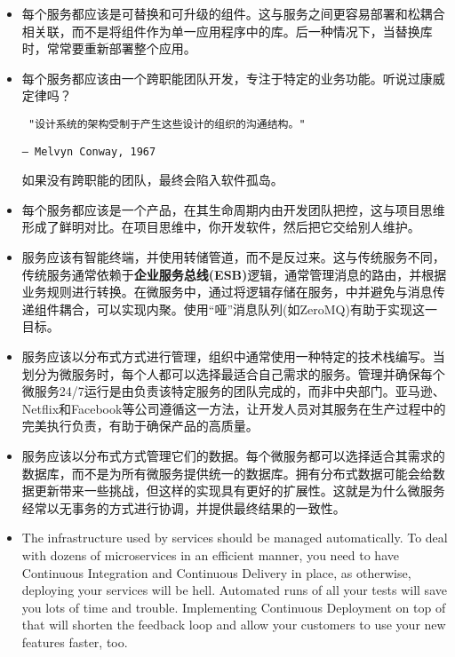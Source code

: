 \begin{itemize}
\item	
每个服务都应该是可替换和可升级的组件。这与服务之间更容易部署和松耦合相关联，而不是将组件作为单一应用程序中的库。后一种情况下，当替换库时，常常要重新部署整个应用。

\item
每个服务都应该由一个跨职能团队开发，专注于特定的业务功能。听说过康威定律吗？

\begin{flushleft}
\tt
"设计系统的架构受制于产生这些设计的组织的沟通结构。"
\end{flushleft}
\begin{flushright}
\texttt{– Melvyn Conway, 1967}
\end{flushright}

如果没有跨职能的团队，最终会陷入软件孤岛。

\item
每个服务都应该是一个产品，在其生命周期内由开发团队把控，这与项目思维形成了鲜明对比。在项目思维中，你开发软件，然后把它交给别人维护。

\item
服务应该有智能终端，并使用转储管道，而不是反过来。这与传统服务不同，传统服务通常依赖于\textbf{企业服务总线(ESB)}逻辑，通常管理消息的路由，并根据业务规则进行转换。在微服务中，通过将逻辑存储在服务，中并避免与消息传递组件耦合，可以实现内聚。使用“哑”消息队列(如ZeroMQ)有助于实现这一目标。

\item
服务应该以分布式方式进行管理，组织中通常使用一种特定的技术栈编写。当划分为微服务时，每个人都可以选择最适合自己需求的服务。管理并确保每个微服务24/7运行是由负责该特定服务的团队完成的，而非中央部门。亚马逊、Netflix和Facebook等公司遵循这一方法，让开发人员对其服务在生产过程中的完美执行负责，有助于确保产品的高质量。

\item
服务应该以分布式方式管理它们的数据。每个微服务都可以选择适合其需求的数据库，而不是为所有微服务提供统一的数据库。拥有分布式数据可能会给数据更新带来一些挑战，但这样的实现具有更好的扩展性。这就是为什么微服务经常以无事务的方式进行协调，并提供最终结果的一致性。

\item
The infrastructure used by services should be managed automatically. To deal with dozens of microservices in an efficient manner, you need to have Continuous Integration and Continuous Delivery in place, as otherwise, deploying your services will be hell. Automated runs of all your tests will save you lots of time and trouble. Implementing Continuous Deployment on top of that will shorten the feedback loop and allow your customers to use your new features faster, too.


\end{itemize}
